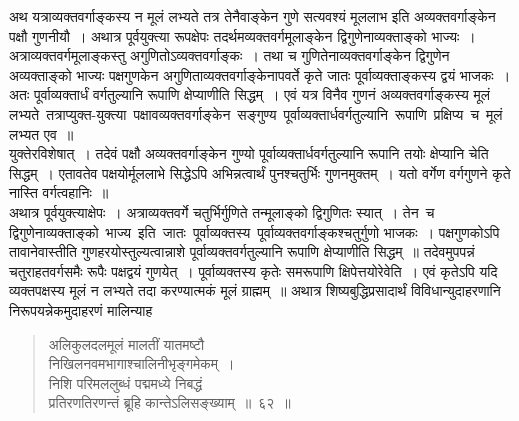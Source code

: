 \documentclass[11pt, openany]{book}
\begin{document}
\vspace{-3mm}
 अथ यत्राव्यक्तवर्गाङ्कस्य न मूलं लभ्यते तत्र तेनैवाङ्केन गुणे सत्यवश्यं
मूललाभ इति अव्यक्तवर्गाङ्केन पक्षौ गुणनीयौ~। अथात्र पूर्वयुक्त्या
रूपक्षेपः तदर्थमव्यक्तवर्गमूलाङ्केन द्विगुणेनाव्यक्ताङ्को भाज्यः~। अत्राव्यक्तवर्गमूलाङ्कस्तु 
अगुणितोऽव्यक्तवर्गाङ्कः~। तथा च गुणितेनाव्यक्तवर्गाङ्केन द्विगुणेन अव्यक्ताङ्को 
भाज्यः पक्षगुणकेन अगुणिताव्यक्तवर्गाङ्केनापवर्ते कृते जातः पूर्वाव्यक्ताङ्कस्य द्वयं 
भाजकः~। अतः पूर्वाव्यक्तार्धं वर्गतुल्यानि रूपाणि क्षेप्याणीति सिद्धम्~।
एवं यत्र विनैव गुणनं अव्यक्तवर्गाङ्कस्य मूलं लभ्यते~तत्राप्युक्त-युक्त्या \,पक्षावव्यक्तवर्गाङ्केन \,सङ्गुण्य \,पूर्वाव्यक्तार्धवर्गतुल्यानि \,रूपाणि \,प्रक्षिप्य \,च \,मूलं लभ्यत एव~॥ \\

\vspace{-3mm}
 युक्तेरविशेषात्~। तदेवं पक्षौ अव्यक्तवर्गाङ्केन गुण्यो पूर्वाव्यक्तार्धवर्गतुल्यानि 
रूपानि तयोः क्षेप्यानि चेति सिद्धम्~। एतावतेव पक्षयोर्मूललाभे सिद्धेऽपि
अभिन्नत्वार्थं पुनश्चतुर्भिः गुणनमुक्तम्~। यतो वर्गेण वर्गगुणने कृते
नास्ति वर्गत्वहानिः~॥ \\

\vspace{-3mm}
 अथात्र पूर्वयुक्त्याक्षेपः~। अत्राव्यक्तवर्गे चतुर्भिर्गुणिते तन्मूलाङ्को 
द्विगुणितः स्यात्~। तेन \,च \,द्विगुणेनाव्यक्ताङ्को \,भाज्य \,इति \,जातः \,पूर्वाव्यक्तस्य \,पूर्वाव्यक्तवर्गाङ्कश्चतुर्गुणो भाजकः~। पक्षगुणकोऽपि तावानेवास्तीति
गुणहरयोस्तुल्यत्वान्नाशे पूर्वाव्यक्तवर्गतुल्यानि रूपाणि क्षेप्याणीति सिद्धम्~॥ 
तदेवमुपपन्नं चतुराहतवर्गसमैः रूपैः पक्षद्वयं गुणयेत्~। पूर्वाव्यक्तस्य कृतेः 
समरूपाणि क्षिपेत्तयोरेवेति~। एवं कृतेऽपि यदि व्यक्तपक्षस्य मूलं न 
लभ्यते तदा करण्यात्मकं मूलं ग्राह्मम्~॥
\newpage%
 अथात्र शिष्यबुद्धिप्रसादार्थं विविधान्युदाहरणानि निरूपयन्नेकमुदाहरणं 
मालिन्याह\textendash 
\begin{quote}
    \ex
    अलिकुलदलमूलं मालतीं यातमष्टौ \\

\vspace{-7mm}
\hspace{1cm} निखिलनवमभागाश्चालिनीभृङ्गमेकम्~। \\

\vspace{-7mm}
 निशि परिमललुब्धं पद्ममध्ये निबद्धं \\

\vspace{-7mm}
\hspace{1cm} प्रतिरणतिरणन्तं ब्रूहि कान्तेऽलिसङ्ख्याम्~॥~६२~॥~
\end{quote}
\end{document}
